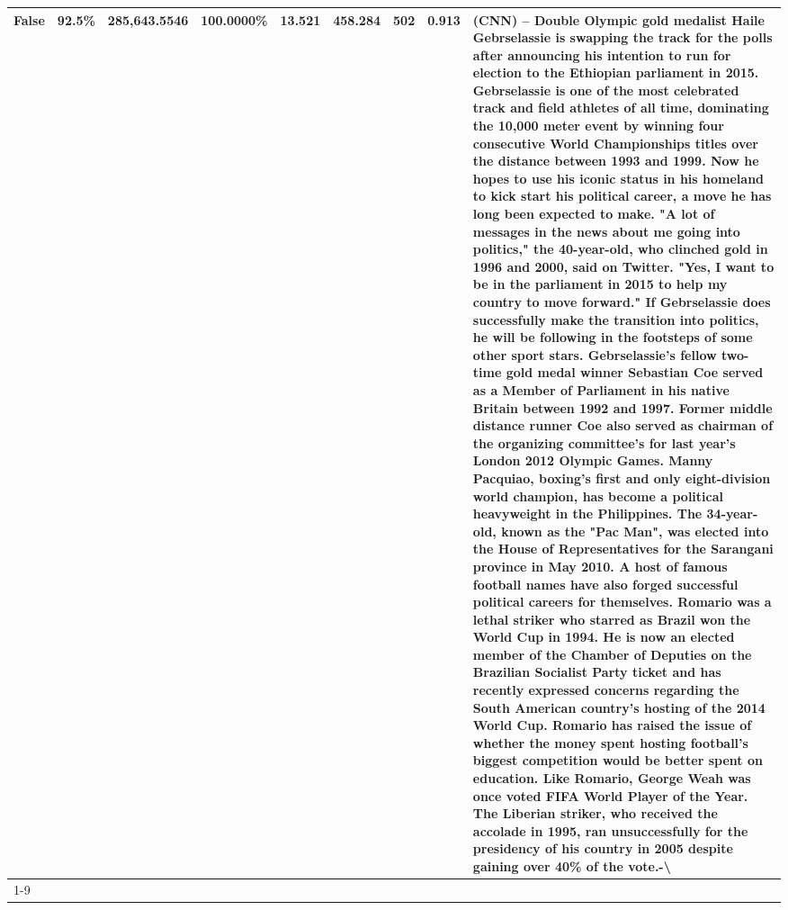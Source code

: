 \begin{table}[H]
{\begin{tabular}{lllrlllll}
False & 92.5\% & 285,643.5546 & \bfseries \color{red} 100.0000\% & 13.521 & 458.284 & 502 & 0.913 & (CNN) -- Double Olympic gold medalist Haile Gebrselassie is swapping the track for the polls after announcing his intention to run for election to the Ethiopian parliament in 2015. Gebrselassie is one of the most celebrated track and field athletes of all time, dominating the 10,000 meter event by winning four consecutive World Championships titles over the distance between 1993 and 1999. Now he hopes to use his iconic status in his homeland to kick start his political career, a move he has long been expected to make. "A lot of messages in the news about me going into politics," the 40-year-old, who clinched gold in 1996 and 2000, said on Twitter. "Yes, I want to be in the parliament in 2015 to help my country to move forward." If Gebrselassie does successfully make the transition into politics, he will be following in the footsteps of some other sport stars. Gebrselassie's fellow two-time gold medal winner Sebastian Coe served as a Member of Parliament in his native Britain between 1992 and 1997. Former middle distance runner Coe also served as chairman of the organizing committee's for last year's London 2012 Olympic Games. Manny Pacquiao, boxing's first and only eight-division world champion, has become a political heavyweight in the Philippines. The 34-year-old, known as the "Pac Man", was elected into the House of Representatives for the Sarangani province in May 2010. A host of famous football names have also forged successful political careers for themselves. Romario was a lethal striker who starred as Brazil won the World Cup in 1994. He is now an elected member of the Chamber of Deputies on the Brazilian Socialist Party ticket and has recently expressed concerns regarding the South American country's hosting of the 2014 World Cup. Romario has raised the issue of whether the money spent hosting football's biggest competition would be better spent on education. Like Romario, George Weah was once voted FIFA World Player of the Year. The Liberian striker, who received the accolade in 1995, ran unsuccessfully for the presidency of his country in 2005 despite gaining over 40\% of the vote.-\textbackslash  \\
\cline{1-9}

\end{tabular}}
\end{table}
